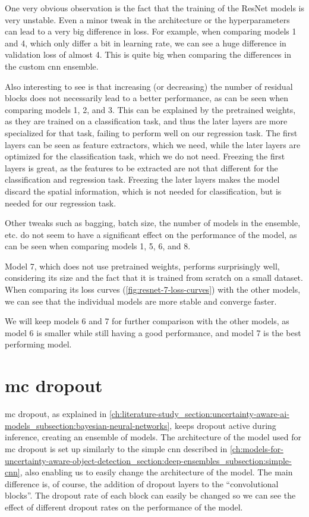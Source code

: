 One very obvious observation is the fact that the training of the ResNet models is very unstable.
Even a minor tweak in the architecture or the hyperparameters can lead to a very big difference in loss.
For example, when comparing models 1 and 4, which only differ a bit in learning rate, we can see a huge difference in validation loss of almost 4.
This is quite big when comparing the differences in the custom \gls{cnn} ensemble.

Also interesting to see is that increasing (or decreasing) the number of residual blocks does not necessarily lead to a better performance, as can be seen when comparing models 1, 2, and 3.
This can be explained by the pretrained weights, as they are trained on a classification task, and thus the later layers are more specialized for that task, failing to perform well on our regression task.
The first layers can be seen as feature extractors, which we need, while the later layers are optimized for the classification task, which we do not need.
Freezing the first layers is great, as the features to be extracted are not that different for the classification and regression task.
Freezing the later layers makes the model discard the spatial information, which is not needed for classification, but is needed for our regression task.

Other tweaks such as bagging, batch size, the number of models in the ensemble, etc. do not seem to have a significant effect on the performance of the model, as can be seen when comparing models 1, 5, 6, and 8.

Model 7, which does not use pretrained weights, performs surprisingly well, considering its size and the fact that it is trained from scratch on a small dataset.
When comparing its loss curves (\cref{fig:resnet-7-loss-curves}) with the other models, we can see that the individual models are more stable and converge faster.

We will keep models 6 and 7 for further comparison with the other models, as model 6 is smaller while still having a good performance, and model 7 is the best performing model.

\section{\gls{mc} dropout}\label{ch:models-for-uncertainty-aware-object-detection_section:mc-dropout}
\gls{mc} dropout, as explained in \cref{ch:literature-study_section:uncertainty-aware-ai-models_subsection:bayesian-neural-networks}, keeps dropout active during inference, creating an ensemble of models.
The architecture of the model used for \gls{mc} dropout is set up similarly to the simple \gls{cnn} described in \cref{ch:models-for-uncertainty-aware-object-detection_section:deep-ensembles_subsection:simple-cnn}, also enabling us to easily change the architecture of the model.
The main difference is, of course, the addition of dropout layers to the ``convolutional blocks''.
The dropout rate of each block can easily be changed so we can see the effect of different dropout rates on the performance of the model.

